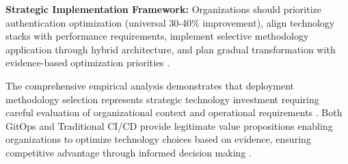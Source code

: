 \textbf{Strategic Implementation Framework:}
Organizations should prioritize authentication optimization (universal 30-40\% improvement), align technology stacks with performance requirements, implement selective methodology application through hybrid architecture, and plan gradual transformation with evidence-based optimization priorities \cite{strategic_implementation,enterprise_transformation}.

The comprehensive empirical analysis demonstrates that deployment methodology selection represents strategic technology investment requiring careful evaluation of organizational context and operational requirements \cite{strategic_technology_planning,investment_decision_frameworks}. Both GitOps and Traditional CI/CD provide legitimate value propositions enabling organizations to optimize technology choices based on evidence, ensuring competitive advantage through informed decision making \cite{competitive_advantage_through_technology,informed_decision_making}.